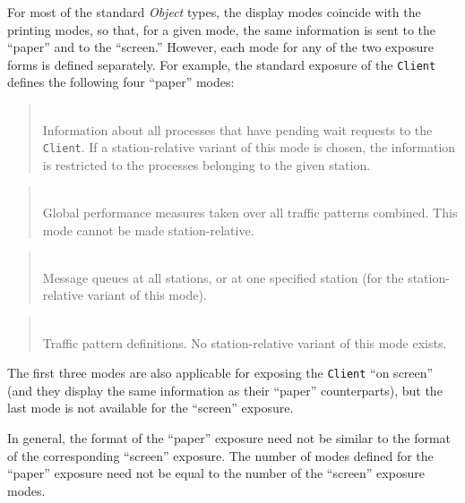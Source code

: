 For most of the standard {\em Object\/} types, the display modes
coincide with the printing modes, so that, for a given mode,
the same information is sent to the ``paper'' and to the ``screen.''
However, each mode for any of the two exposure forms is defined
separately.
For example, the standard exposure of the {\tt Client} defines the following
four ``paper'' modes:

\medskip

\begin{quote}
\noindent{}\\ \hspace{0in}
Information about all processes that have pending wait requests to the
{\tt Client}.
If a station-relative variant of this mode is chosen, the information
is restricted to the processes belonging to the given station.
\end{quote}

\begin{quote}
\noindent{}\\ \hspace{0in}
Global performance measures taken over all traffic patterns combined.
This mode cannot be made station-relative.
\end{quote}

\begin{quote}
\noindent{}\\ \hspace{0in}
Message queues at all stations, or at one specified station (for the
station-relative variant of this mode).
\end{quote}

\begin{quote}
\noindent{}\\ \hspace{0in}
Traffic pattern definitions.
No station-relative variant of this mode exists.
\end{quote}\medskip

The first three modes are also applicable
for exposing the {\tt Client} ``on screen''
(and they display the same information as their ``paper'' counterparts),
but the last mode is not available for the ``screen'' exposure.

In general, the format of the ``paper'' exposure need not be
similar to the format of the corresponding ``screen'' exposure.
The number of modes defined for the ``paper'' exposure need not be equal
to the number of the ``screen'' exposure modes.

